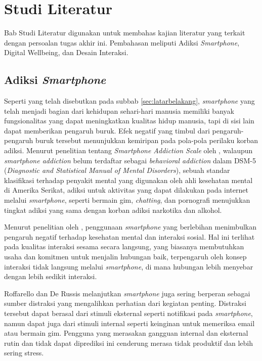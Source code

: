 \chapter{Studi Literatur}


\newcommand{\cbnormspacing}{\baselineskip=12pt}

Bab Studi Literatur digunakan untuk membahas kajian literatur yang terkait dengan persoalan tugas akhir ini. Pembahasan meliputi Adiksi \textit{Smartphone}, Digital Wellbeing, dan Desain Interaksi.

\section{Adiksi \textit{Smartphone}}
Seperti yang telah disebutkan pada subbab \ref{sec:latarbelakang}, \textit{smartphone} yang telah menjadi bagian dari kehidupan sehari-hari manusia memiliki banyak fungsionalitas yang dapat meningkatkan kualitas hidup manusia, tapi di sisi lain dapat memberikan pengaruh buruk. Efek negatif yang timbul dari pengaruh-pengaruh buruk tersebut menunjukkan kemiripan pada pola-pola perilaku korban adiksi. Menurut penelitian tentang \textit{Smartphone Addiction Scale} oleh \textcite{10.1371/journal.pone.0083558}, walaupun \textit{smartphone addiction} belum terdaftar sebagai \textit{behavioral addiction} dalam DSM-5 (\textit{Diagnostic and Statistical Manual of Mental Disorders}), sebuah standar klasifikasi terhadap penyakit mental yang digunakan oleh ahli kesehatan mental di Amerika Serikat, adiksi untuk aktivitas yang dapat dilakukan pada internet melalui \textit{smartphone}, seperti bermain gim, \textit{chatting}, dan pornografi menujukkan tingkat adiksi yang sama dengan korban adiksi narkotika dan alkohol.

Menurut penelitian oleh \textcite{CHI2019SOCIALIZE}, penggunaan \textit{smartphone} yang berlebihan menimbulkan pengaruh negatif terhadap kesehatan mental dan interaksi sosial. Hal ini terlihat pada kualitas interaksi sesama secara langsung, yang biasanya membutuhkan usaha dan komitmen untuk menjalin hubungan baik, terpengaruh oleh konsep interaksi tidak langsung melalui \textit{smartphone}, di mana hubungan lebih menyebar dengan lebih sedikit interaksi.

Roffarello dan De Russis melanjutkan \textit{smartphone} juga sering berperan sebagai sumber distraksi yang mengalihkan perhatian dari kegiatan penting. Distraksi tersebut dapat berasal dari stimuli eksternal seperti notifikasi pada \textit{smartphone}, namun dapat juga dari stimuli internal seperti keinginan untuk memeriksa email atau bermain gim. Pengguna yang merasakan gangguan internal dan eksternal rutin dan tidak dapat diprediksi ini cenderung merasa tidak produktif dan lebih sering stress.

